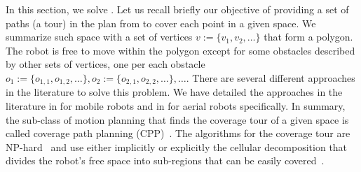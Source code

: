 In this section, we solve . Let us recall briefly our objective of providing a set of paths (a tour) in the plan from  to cover each point in a given space. We summarize such space with a set of vertices $v:=\{v_1,v_2,\dots\}$ that form a polygon. The robot is free to move within the polygon except for some obstacles described by other sets of vertices, one per each obstacle $o_1:=\{o_{1,1},o_{1,2},\dots\},o_2:=\{o_{2,1},o_{2,2},\dots\},\dots$. There are several different approaches in the literature to solve this problem. We have detailed the approaches in the literature in  for mobile robots and in  for aerial robots specifically. In summary, the sub-class of motion planning that finds the coverage tour of a given space is called coverage path planning (CPP)~\citep{choset1998coverage}. The algorithms for the coverage tour are NP-hard~\citep{arkin2000approximation} and use either implicitly or explicitly the cellular decomposition that divides the robot's free space into sub-regions that can be easily covered~\citep{choset2001coverage,galceran2013survey}.

